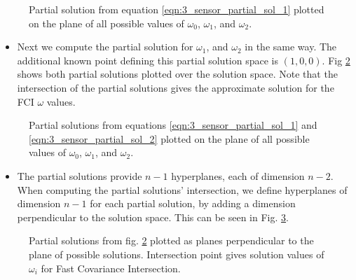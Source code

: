 \documentclass[letterpaper, 10 pt, conference]{ieeeconf}  %
\begin{document}
\begin{figure}[tb]
   \begin{center}
      
   \end{center}
   \caption{Partial solution from equation \eqref{eqn:3_sensor_partial_sol_1} plotted on the plane of all possible values of $\omega_0$, $\omega_1$, and $\omega_2$.}
   \label{fig:3_sensor_partial_sol}
\end{figure}

\begin{itemize}
   \item Next we compute the partial solution for $\omega_1$, and $\omega_2$ in the same way. The additional known point defining this partial solution space is $(1,0,0)$. Fig \ref{fig:3_sensor_partial_sols} shows both partial solutions plotted over the solution space. Note that the intersection of the partial solutions gives the approximate solution for the FCI $\omega$ values.
\end{itemize}

\begin{figure}[tb]
   \begin{center}
      
   \end{center}
   \caption{Partial solutions from equations \eqref{eqn:3_sensor_partial_sol_1} and \eqref{eqn:3_sensor_partial_sol_2} plotted on the plane of all possible values of $\omega_0$, $\omega_1$, and $\omega_2$.}
   \label{fig:3_sensor_partial_sols}
\end{figure}

\begin{itemize}
   \item The partial solutions provide $n-1$ hyperplanes, each of dimension $n-2$. When computing the partial solutions' intersection, we define hyperplanes of dimension $n-1$ for each partial solution, by adding a dimension perpendicular to the solution space. This can be seen in Fig. \ref{fig:3sen_planes}.
\end{itemize}

\begin{figure}[tb]
   \begin{center}
      
   \end{center}
   \caption{Partial solutions from fig. \ref{fig:3_sensor_partial_sols} plotted as planes perpendicular to the plane of possible solutions. Intersection point gives solution values of $\omega_i$ for Fast Covariance Intersection.}
   \label{fig:3sen_planes}
\end{figure}
\end{document}

